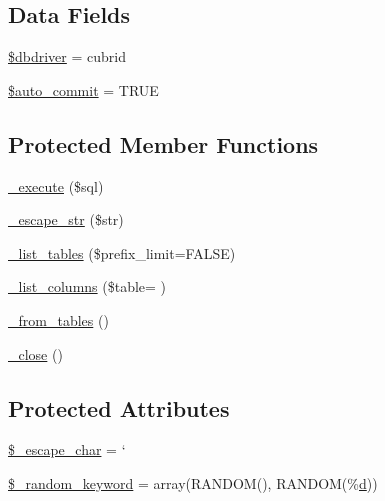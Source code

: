 \subsection*{Data Fields}
\begin{DoxyCompactItemize}
\item 
\hyperlink{class_c_i___d_b__cubrid__driver_a0cde2a16322a023d040aa7f725877597}{\$dbdriver} = \textquotesingle{}cubrid\textquotesingle{}
\item 
\hyperlink{class_c_i___d_b__cubrid__driver_a2620b91fdfd73aa770c443ad172f1914}{\$auto\+\_\+commit} = T\+R\+U\+E
\end{DoxyCompactItemize}
\subsection*{Protected Member Functions}
\begin{DoxyCompactItemize}
\item 
\hyperlink{class_c_i___d_b__cubrid__driver_a114ab675d89bf8324a41785fb475e86d}{\+\_\+execute} (\$sql)
\item 
\hyperlink{class_c_i___d_b__cubrid__driver_af8ef0237bfcdb19215b63fff769e7a55}{\+\_\+escape\+\_\+str} (\$str)
\item 
\hyperlink{class_c_i___d_b__cubrid__driver_a435c0f3ce54fe7daa178baa8532ebd54}{\+\_\+list\+\_\+tables} (\$prefix\+\_\+limit=F\+A\+L\+S\+E)
\item 
\hyperlink{class_c_i___d_b__cubrid__driver_a2a81bb476a5c76fe6f763b0557c1e4c2}{\+\_\+list\+\_\+columns} (\$table= \textquotesingle{}\textquotesingle{})
\item 
\hyperlink{class_c_i___d_b__cubrid__driver_aef43f7e3e7b71d337ff3724c5eb14f10}{\+\_\+from\+\_\+tables} ()
\item 
\hyperlink{class_c_i___d_b__cubrid__driver_a4d9082658000e5ede8312067c6dda9db}{\+\_\+close} ()
\end{DoxyCompactItemize}
\subsection*{Protected Attributes}
\begin{DoxyCompactItemize}
\item 
\hyperlink{class_c_i___d_b__cubrid__driver_aaec2fb0112850159063a8e47ad3aed6e}{\$\+\_\+escape\+\_\+char} = \textquotesingle{}`\textquotesingle{}
\item 
\hyperlink{class_c_i___d_b__cubrid__driver_a10213aa6e05f6d924d3277bb1d2fea00}{\$\+\_\+random\+\_\+keyword} = array(\textquotesingle{}R\+A\+N\+D\+O\+M()\textquotesingle{}, \textquotesingle{}R\+A\+N\+D\+O\+M(\%\hyperlink{assets_2js_2bootstrap_8min_8js_aeb337d295abaddb5ec3cb34cc2e2bbc9}{d})\textquotesingle{})
\end{DoxyCompactItemize}


